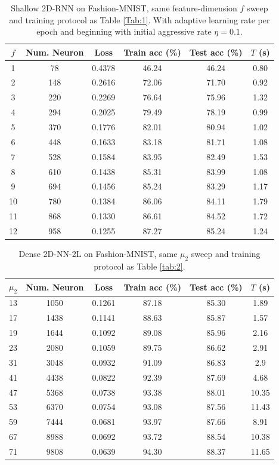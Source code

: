 \documentclass[pdflatex,sn-mathphys-num]{sn-jnl}%
\theoremstyle{thmstyleone}%
\theoremstyle{thmstyletwo}%
\theoremstyle{thmstylethree}%
\begin{document}
\begin{table}[htbp]
\centering 
\caption{Shallow 2D-RNN on Fashion-MNIST, same feature-dimension $f$ sweep and training protocol as Table \ref{Tab:1}. With adaptive learning rate per epoch and beginning with initial aggressive rate $\eta=0.1.$}
\label{tab:fashion12}
\begin{tabular}{cccccc}
\toprule
$f$ & Num. Neuron & Loss & Train acc (\%) & Test acc (\%) & $T$ (s) \\
\midrule
1  &  78  & 0.4378 & 46.24 & 46.24 & 0.80    \\
 2  & 148  & 0.2616 & 72.06 & 71.70 & 0.92 \\
 3  & 220  & 0.2269 & 76.64 & 75.96 & 1.32\\
  4  & 294  & 0.2025 & 79.49 & 78.19 & 0.99\\
  5  & 370  & 0.1776 & 82.01 & 80.94 & 1.02\\
  6  & 448  & 0.1633 & 83.18 & 81.71 & 1.08 \\
  7  & 528  & 0.1584 & 83.95 & 82.49 & 1.53\\
  8  & 610  & 0.1438 & 85.31 & 83.99 & 1.08\\
  9  & 694  & 0.1456 & 85.24 & 83.29 & 1.17\\
  10  & 780  & 0.1384 & 86.06 & 84.11 & 1.79\\
  11  & 868  & 0.1330 & 86.61 & 84.52 & 1.72\\
   12  & 958  & 0.1255 & 87.27 & 85.24 & 1.24\\
\bottomrule
\end{tabular}
\end{table}


\begin{table}[htbp]
\centering 
\caption{Dense 2D-NN-2L on Fashion-MNIST, same $\mu_2$ sweep and training protocol as Table \ref{tab:2}.}
\label{tab:fashion13}
\begin{tabular}{cccccc}
\toprule
$\mu_2$ & Num. Neuron & Loss & Train acc (\%) & Test acc (\%) & $T$ (s) \\
\midrule
13  & 1050  & 0.1261 & 87.18 & 85.30 & 1.89\\
17  & 1438  & 0.1141 & 88.63 & 85.87 & 1.57   \\
19  & 1644  & 0.1092 & 89.08 & 85.96 & 2.16 \\
23  & 2080  & 0.1059 & 89.75 & 86.62 & 2.91  \\
31  & 3048  & 0.0932 & 91.09 & 86.83 & 2.9 \\
  41 & 4438  & 0.0822 & 92.39 & 87.69 & 4.68    \\
47  & 5368  & 0.0738 & 93.38 & 88.01 & 10.35\\
53  & 6370  & 0.0754 & 93.08 & 87.56 & 11.43    \\
59  & 7444  & 0.0681 & 93.97 & 87.66 & 8.91 \\
67  & 8988  & 0.0692 & 93.72 & 88.54 & 10.38 \\
71  & 9808  & 0.0639 & 94.30 & 88.37 & 11.65\\ 
\bottomrule
\end{tabular}
\end{table}
\end{document}
